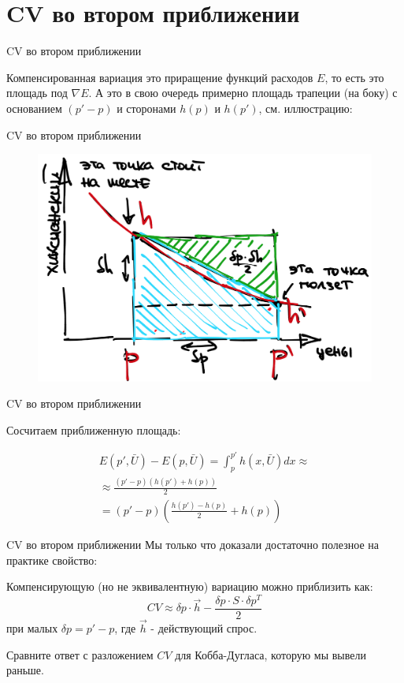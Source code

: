\documentclass{beamer}
\begin{document}
\section{CV во втором приближении}

\begin{frame}{CV во втором приближении}

Компенсированная вариация это приращение функций расходов $E$, то есть это площадь под $\nabla E$. А это в свою очередь примерно площадь трапеции (на боку) с основанием $(p'-p)$ и сторонами $h(p)$ и $h(p')$, см. иллюстрацию:

\end{frame}

\begin{frame}{CV во втором приближении}

\begin{figure}[hbt]
\centering
\includegraphics[width=.8 \textwidth]{slutsky.png}
\end{figure}

\end{frame}

\begin{frame}{CV во втором приближении}

Сосчитаем приближенную площадь:

\begin{gather*}
E(p', \bar U) - E(p, \bar U) = \int_p^{p'} h(x, \bar U) dx \approx\\
\approx \frac{(p'-p)(h(p')+h(p))}{2}\\
 = (p'-p)(\frac{h(p') - h(p)}{2} + h(p))
\end{gather*}

\end{frame}

\begin{frame}{CV во втором приближении}
Мы только что доказали достаточно полезное на практике свойство:

\begin{lemma}
Компенсирующую (но не эквивалентную) вариацию можно приблизить как:
$$CV \approx \delta p \cdot \vec h - \frac{\delta p \cdot S \cdot \delta p^T}{2}$$
при малых $\delta p = p' - p$, где $\vec h$ - действующий спрос.
\end{lemma}

Сравните ответ с разложением $CV$ для Кобба-Дугласа, которую мы вывели раньше.

\end{frame}
\end{document}
